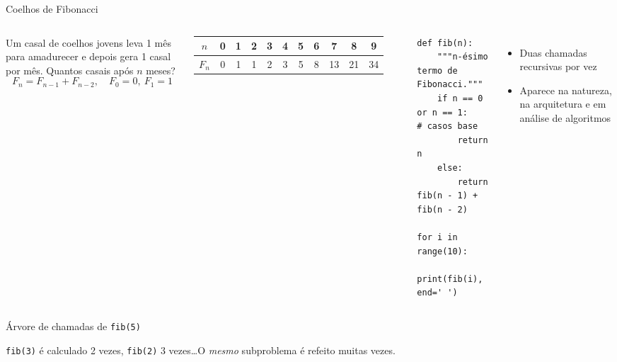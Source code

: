 \documentclass[aspectratio=169,10pt,t]{beamer}
\begin{document}
\begin{frame}[fragile]{Coelhos de Fibonacci}
  \begin{columns}[T]
    Um casal de coelhos jovens leva 1 mês para amadurecer e depois gera 1 casal por mês. Quantos casais após \(n\) meses?
    \[ F_n = F_{n-1} + F_{n-2},\quad F_0=0,\ F_1=1 \]
    \centering\small
    \begin{tabular}{c|cccccccccc}
      \(n\) & 0 & 1 & 2 & 3 & 4 & 5 & 6 & 7 & 8 & 9\\\hline
      \(F_n\) & 0 & 1 & 1 & 2 & 3 & 5 & 8 & 13 & 21 & 34\\
    \end{tabular}
\begin{lstlisting}[basicstyle=\ttfamily\scriptsize]
def fib(n):
    """n-ésimo termo de Fibonacci."""
    if n == 0 or n == 1:     # casos base
        return n
    else:
        return fib(n - 1) + fib(n - 2)

for i in range(10):
    print(fib(i), end=' ')
\end{lstlisting}
    \begin{itemize}\small
      \item \alert{Duas} chamadas recursivas por vez
      \item Aparece na natureza, na arquitetura e em análise de algoritmos
    \end{itemize}
  \end{columns}
\end{frame}

\begin{frame}{Árvore de chamadas de \texttt{fib(5)}}
  \centering

  \small \texttt{fib(3)} é calculado \alert{2 vezes}, \texttt{fib(2)} 3 vezes\ldots O \emph{mesmo} subproblema é refeito muitas vezes.
\end{frame}
\end{document}
